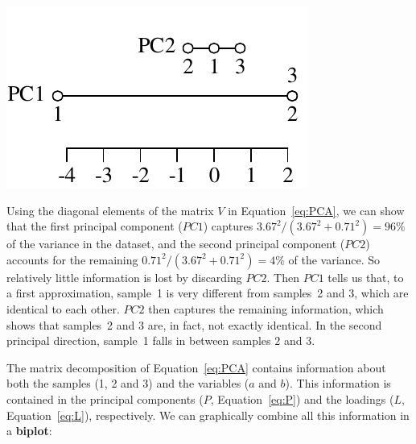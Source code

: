 \noindent\begin{minipage}[t][][b]{.25\textwidth}
  \includegraphics[width=\textwidth]{../figures/PCA2D2.pdf}\medskip
\end{minipage}
\begin{minipage}[t][][t]{.75\textwidth}
  \label{fig:PCA2D2}
\end{minipage}

Using the diagonal elements of the matrix $V$ in
Equation~\ref{eq:PCA}, we can show that the first principal component
($PC1$) captures $3.67^2/(3.67^2+0.71^2)=96\%$ of the variance in the
dataset, and the second principal component ($PC2$) accounts for the
remaining $0.71^2/(3.67^2+0.71^2)=4\%$ of the variance. So relatively
little information is lost by discarding $PC2$. Then $PC1$ tells us
that, to a first approximation, sample~1 is very different from
samples~2 and 3, which are identical to each other. $PC2$ then
captures the remaining information, which shows that samples~2 and 3
are, in fact, not exactly identical. In the second principal
direction, sample~1 falls in between samples $2$ and $3$.\medskip

The matrix decomposition of Equation~\ref{eq:PCA} contains information
about both the samples (1, 2 and 3) and the variables ($a$ and $b$).
This information is contained in the principal components ($P$,
Equation~\ref{eq:P}) and the loadings ($L$, Equation~\ref{eq:L}),
respectively.  We can graphically combine all this information in a
\textbf{biplot}:

